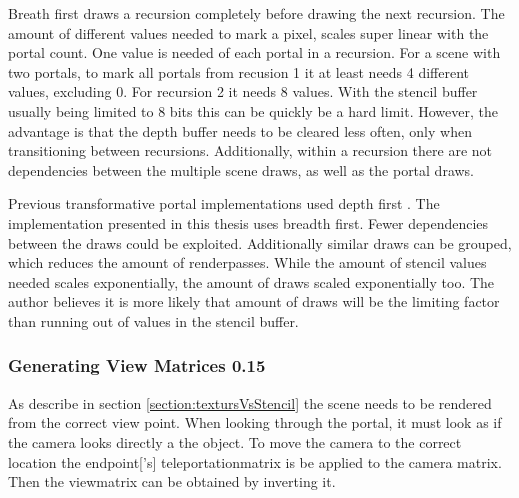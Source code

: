 Breath first draws a recursion completely before drawing the next recursion. The amount of different values needed to mark a pixel, scales super linear with the portal count. One value is needed of each portal in a recursion. For a scene with two portals, to mark all portals from recusion 1 it at least needs 4 different values, excluding 0. For recursion 2 it needs 8 values. With the stencil buffer usually being limited to 8 bits this can be quickly be a hard limit. However, the advantage is that the depth buffer needs to be cleared less often, only when transitioning between recursions. Additionally, within a recursion there are not dependencies between the multiple scene draws, as well as the portal draws.

Previous transformative portal implementations used depth first \cite{lowe:2005:technique,lecture:portalProblems}. The implementation presented in this thesis uses breadth first. Fewer dependencies between the draws could be exploited. Additionally similar draws can be grouped, which reduces the amount of renderpasses. While the amount of stencil values needed scales exponentially, the amount of draws scaled exponentially too. The author believes it is more likely that amount of draws will be the limiting factor than running out of values in the stencil buffer.



\subsubsection{Generating View Matrices 0.15}
\label{section:generatingviewmatrices}
As describe in section \ref{section:textursVsStencil} the scene needs to be rendered from the correct view point. When looking through the portal, it must look as if the camera looks directly a the object. To move the camera to the correct location the \gls{endpoint}['s] \gls{teleportationmatrix} is be applied to the camera matrix. Then the  \gls{viewmatrix} can be obtained by inverting it.






